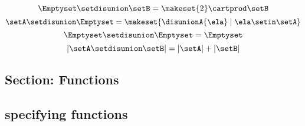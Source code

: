 \begin{forslides}
\begin{equation}
        \Emptyset \setdisunion \setB =  \makeset{2} \cartprod \setB
    \end{equation}
    \begin{equation}
        \label{eq:slides_session2_73}
        \setA \setdisunion \Emptyset =  \makeset{ \disunionA{\ela} \mid \ela \setin\setA }
    \end{equation}
    \begin{equation}
        \label{eq:slides_session2_74}
        \Emptyset \setdisunion \Emptyset = \Emptyset
    \end{equation}
    \begin{equation}
        \label{eq:slides_session2_75}
        \vert \setA \setdisunion \setB \vert = \vert \setA \vert + \vert \setB \vert
    \end{equation}

    \subsection{Section: Functions}

    \subsection{specifying functions}


\end{forslides}
